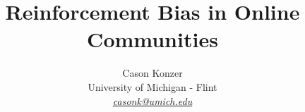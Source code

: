 \documentclass[a4paper, 12pt]{article} %
\date{} %
\begin{document}
\title{Reinforcement Bias in Online Communities}

\vspace{0.5cm}
\author{ Cason Konzer \\ %
       University of Michigan - Flint \\ %
       \textit{\color{violet}
       \href{mailto:casonk@umich.edu}{casonk@umich.edu}} %
       }

\maketitle

\thispagestyle{empty}

\end{document}

